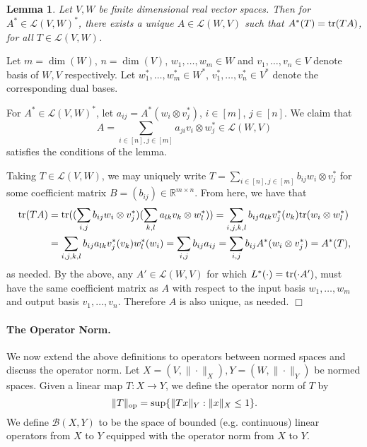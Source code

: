 \documentclass[11pt]{article}
\newtheorem{lemma}[theorem]{Lemma}
\theoremstyle{plain}
\newenvironment{proof}{\noindent {\sc Proof:}}{$\Box$ \medskip}
\theoremstyle{plain}
\newcommand{\set}[1]{\{{#1}\}}
\newcommand{\R}{\ensuremath{\mathbb{R}}}
\begin{document}
\begin{lemma}\label{lem:dual-l} 
Let $V,W$ be finite dimensional real vector spaces. Then for $A^* \in
\mathcal{L}(V,W)^*$, there exists a unique $A \in \mathcal{L}(W,V)$ such that
$A^*(T) = {\rm tr}(T A)$, for all $T \in \mathcal{L}(V,W)$.
\end{lemma}
\begin{proof}
Let $m=\dim(W)$, $n = \dim(V)$, $w_1,\dots,w_m \in W$ and $v_1,\dots,v_n \in V$
denote basis of $W,V$ respectively. Let $w_1^*,\dots,w_m^* \in W^*$,
$v_1^*,\dots,v_n^* \in V^*$ denote the corresponding dual bases.

For $A^* \in \mathcal{L}(V,W)^*$, let $a_{ij} = A^*(w_i \otimes v_j^*)$, $i \in
[m]$, $j \in [n]$. We claim that 
\[
A = \sum_{i \in [n],j \in [m]} a_{ji} v_i \otimes w_j^* \in \mathcal{L}(W,V)
\]
satisfies the conditions of the lemma. 

Taking $T \in \mathcal{L}(V,W)$, we may uniquely write $T = \sum_{i \in [n], j
\in [m]} b_{ij} w_i \otimes v_j^*$ for some coefficient matrix $B=(b_{ij}) \in
\R^{m \times n}$. From here, we have that
\begin{align*}
{\rm tr}(T A) &= {\rm tr}((\sum_{i,j} b_{ij} w_i \otimes v_j^*)(\sum_{k,l} a_{lk}
v_k \otimes w_l^*)) 
  = \sum_{i,j,k,l} b_{ij} a_{lk} v_j^*(v_k){\rm tr}(w_i \otimes w_l^*) \\
  &= \sum_{i,j,k,l} b_{ij} a_{lk} v_j^*(v_k) w_l^*(w_i) 
  = \sum_{i,j} b_{ij} a_{ij} = \sum_{i,j} b_{ij}A^*(w_i \otimes v_j^*) 
  = A^*(T),
\end{align*} 
as needed. By the above, any $A' \in \mathcal{L}(W,V)$ for which $L^*(\cdot) =
{\rm tr}(\cdot A')$, must have the same coefficient matrix as $A$ with respect
to the input basis $w_1,\dots,w_m$ and output basis $v_1,\dots,v_n$. Therefore
$A$ is also unique, as needed. 
\end{proof}

\paragraph{\bf The Operator Norm.}

We now extend the above definitions to operators between normed spaces and
discuss the operator norm. Let $X=(V,\|\cdot\|_X), Y=(W,\|\cdot\|_Y)$ be normed
spaces. Given a linear map $T: X \rightarrow Y$, we define the operator norm of
$T$ by \begin{equation}
\label{def:operator-norm}
\|T\|_{\rm op} = \sup \set{\|Tx\|_Y: \|x\|_X \leq 1}.
\end{equation}
We define $\mathcal{B}(X,Y)$ to be the space of bounded  (e.g.  continuous)
linear operators from $X$ to $Y$ equipped with the operator norm from $X$ to
$Y$.
\end{document}
